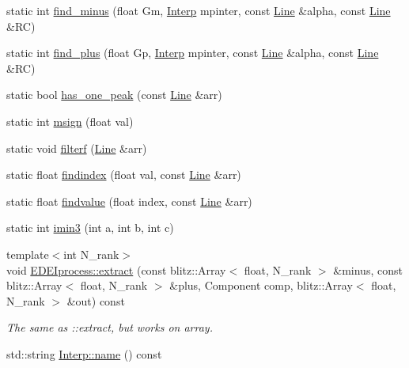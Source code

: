 \begin{DoxyCompactItemize}
\item 
static int \hyperlink{group__edeiedei_ga7051d1418260969567626bc346f461b6}{find\_\-minus} (float Gm, \hyperlink{classInterp}{Interp} mpinter, const \hyperlink{group__Types_ga4ce3fdeba27702c8b09a141e22709e38}{Line} \&alpha, const \hyperlink{group__Types_ga4ce3fdeba27702c8b09a141e22709e38}{Line} \&RC)
\item 
static int \hyperlink{group__edeiedei_gadd73b548c2e26edb9aa533dc7980bb0c}{find\_\-plus} (float Gp, \hyperlink{classInterp}{Interp} mpinter, const \hyperlink{group__Types_ga4ce3fdeba27702c8b09a141e22709e38}{Line} \&alpha, const \hyperlink{group__Types_ga4ce3fdeba27702c8b09a141e22709e38}{Line} \&RC)
\item 
static bool \hyperlink{group__edeiedei_ga086a5a5bd40fea8c2b44b7bf61794aef}{has\_\-one\_\-peak} (const \hyperlink{group__Types_ga4ce3fdeba27702c8b09a141e22709e38}{Line} \&arr)
\item 
static int \hyperlink{group__edeiedei_ga0c16a5e954ab6ffa3deadb42f94be89d}{msign} (float val)
\item 
static void \hyperlink{group__edeiedei_gac2df424ffcde11ed7514f1ed31434a55}{filterf} (\hyperlink{group__Types_ga4ce3fdeba27702c8b09a141e22709e38}{Line} \&arr)
\item 
static float \hyperlink{group__edeiedei_ga8d28a7beff8f42ab38aaff792b25206d}{findindex} (float val, const \hyperlink{group__Types_ga4ce3fdeba27702c8b09a141e22709e38}{Line} \&arr)
\item 
static float \hyperlink{group__edeiedei_ga89dee3af9e649add0e1b5db34c7f463b}{findvalue} (float index, const \hyperlink{group__Types_ga4ce3fdeba27702c8b09a141e22709e38}{Line} \&arr)
\item 
static int \hyperlink{group__edeiedei_ga6afb620f09765f6c83a3cf4840cc41b9}{imin3} (int a, int b, int c)
\item 
{\footnotesize template$<$int N\_\-rank$>$ }\\void \hyperlink{group__edeiedei_gaa8f414bd247177bd9f58be27c716fab9}{EDEIprocess::extract} (const blitz::Array$<$ float, N\_\-rank $>$ \&minus, const blitz::Array$<$ float, N\_\-rank $>$ \&plus, Component comp, blitz::Array$<$ float, N\_\-rank $>$ \&out) const 
\begin{DoxyCompactList}\small\item\em The same as ::extract, but works on array. \item\end{DoxyCompactList}\item 
std::string \hyperlink{group__edeiedei_ga9473b5ac52a3b4d72a1569eb3719ee4c}{Interp::name} () const 

\end{DoxyCompactItemize}
